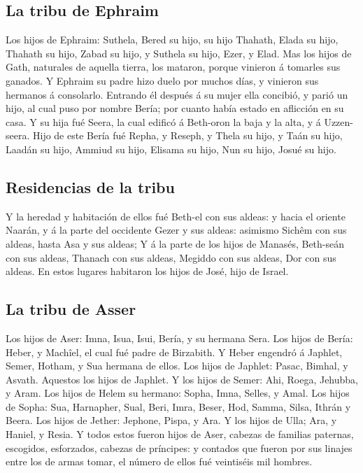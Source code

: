 \hypertarget{la-tribu-de-ephraim}{%
\subsection{La tribu de Ephraim}\label{la-tribu-de-ephraim}}

 Los hijos de Ephraim: Suthela, Bered su hijo, su hijo
Thahath, Elada su hijo, Thahath su hijo,  Zabad su hijo, y
Suthela su hijo, Ezer, y Elad. Mas los hijos de Gath, naturales de
aquella tierra, los mataron, porque vinieron á tomarles sus ganados.
 Y Ephraim su padre hizo duelo por muchos días, y vinieron
sus hermanos á consolarlo.  Entrando él después á su mujer
ella concibió, y parió un hijo, al cual puso por nombre Bería; por
cuanto había estado en aflicción en su casa.  Y su hija fué
Seera, la cual edificó á Beth-oron la baja y la alta, y á Uzzen-seera.
 Hijo de este Bería fué Repha, y Reseph, y Thela su hijo, y
Taán su hijo,  Laadán su hijo, Ammiud su hijo, Elisama su
hijo,  Nun su hijo, Josué su hijo.

\hypertarget{residencias-de-la-tribu}{%
\subsection{Residencias de la tribu}\label{residencias-de-la-tribu}}

 Y la heredad y habitación de ellos fué Beth-el con sus
aldeas: y hacia el oriente Naarán, y á la parte del occidente Gezer y
sus aldeas: asimismo Sichêm con sus aldeas, hasta Asa y sus aldeas;
 Y á la parte de los hijos de Manasés, Beth-seán con sus
aldeas, Thanach con sus aldeas, Megiddo con sus aldeas, Dor con sus
aldeas. En estos lugares habitaron los hijos de José, hijo de Israel.

\hypertarget{la-tribu-de-asser}{%
\subsection{La tribu de Asser}\label{la-tribu-de-asser}}

 Los hijos de Aser: Imna, Isua, Isui, Bería, y su hermana
Sera.  Los hijos de Bería: Heber, y Machîel, el cual fué
padre de Birzabith.  Y Heber engendró á Japhlet, Semer,
Hotham, y Sua hermana de ellos.  Los hijos de Japhlet:
Pasac, Bimhal, y Asvath. Aquestos los hijos de Japhlet.  Y
los hijos de Semer: Ahi, Roega, Jehubba, y Aram.  Los hijos
de Helem su hermano: Sopha, Imna, Selles, y Amal.  Los
hijos de Sopha: Sua, Harnapher, Sual, Beri, Imra,  Beser,
Hod, Samma, Silsa, Ithrán y Beera.  Los hijos de Jether:
Jephone, Pispa, y Ara.  Y los hijos de Ulla; Ara, y Haniel,
y Resia.  Y todos estos fueron hijos de Aser, cabezas de
familias paternas, escogidos, esforzados, cabezas de príncipes: y
contados que fueron por sus linajes entre los de armas tomar, el número
de ellos fué veintiséis mil hombres.

